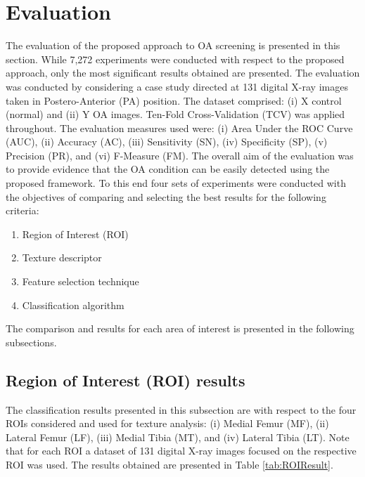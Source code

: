 \documentclass[review]{elsarticle}
\begin{document}
\section{Evaluation}

The evaluation of the proposed approach to OA screening is presented in this section. While 7,272 experiments were conducted with respect to the proposed approach, only the most significant results obtained are presented. The evaluation was conducted by considering a case study directed at 131 digital X-ray images taken in Postero-Anterior (PA) position. The dataset comprised: (i) X control (normal) and (ii) Y OA images. Ten-Fold Cross-Validation (TCV) was applied throughout. The evaluation measures used were: (i) Area Under the ROC Curve (AUC), (ii) Accuracy (AC), (iii) Sensitivity (SN), (iv) Specificity (SP), (v) Precision (PR), and (vi) F-Measure (FM). The overall aim of the evaluation was to provide evidence that the OA condition can be easily detected using the proposed framework. To this end four sets of experiments were conducted with the objectives of comparing and selecting the best results for the following criteria:

\begin{enumerate}
\item Region of Interest (ROI)
\item Texture descriptor
\item Feature selection technique
\item Classification algorithm
\end{enumerate}



The comparison and results for each area of interest is presented in the following subsections.

\subsection{Region of Interest (ROI) results}

The classification results presented in this subsection are with respect to the four ROIs considered and used for texture analysis: (i) Medial Femur (MF), (ii) Lateral Femur (LF), (iii) Medial Tibia (MT), and (iv) Lateral Tibia (LT). Note that for each ROI a dataset of 131 digital X-ray images focused on the respective ROI was used. The results obtained are presented in Table \ref{tab:ROIResult}. \\
\end{document}
